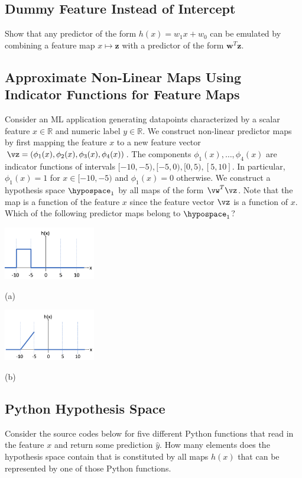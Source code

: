 \documentclass[12pt]{report}
\begin{document}
\subsection{Dummy Feature Instead of Intercept}
\label{sec_dummy_feature}
Show that any predictor of the form $h(x) = w_{1} x +w_{0}$ can be emulated by 
combining a feature map $x \mapsto \mathbf{z}$ with a predictor of the form $\mathbf{w}^{T} \mathbf{z}$. 

\subsection{Approximate Non-Linear Maps Using Indicator Functions for Feature Maps}
\label{ex_2_2}
Consider an ML application generating datapoints characterized by a scalar feature $x \in \mathbb{R}$ 
and numeric label $y \in \mathbb{R}$. We construct non-linear predictor maps by first mapping the 
feature $x$ to a new feature vector $\vz=(\phi_{1}(x),\phi_{2}(x),\phi_{3}(x),\phi_{4}(x))$. 
The components $\phi_{1}(x),\ldots,\phi_{4}(x)$ are indicator functions of intervals 
$[-10,-5), [-5,0),[0,5),[5,10]$. In particular, $\phi_{1}(x) = 1$ for $x \in [-10,-5)$ and $\phi_{1}(x)=0$ otherwise. 
We construct a hypothesis space $\hypospace_{1}$ by all maps of the form $\vw^{T}\vz$. 
Note that the map is a function of the feature $x$ since the feature vector $\vz$ is a function 
of $x$. Which of the following predictor maps belong to $\hypospace_{1}$?

\begin{minipage}{.5\textwidth} %
\includegraphics[width=4cm]{PiecewiseFun1.png}

(a)
\end{minipage} %
\begin{minipage}{.5\textwidth} %
	\includegraphics[width=4cm]{PiecewiseFun2.png}
	
(b)
\end{minipage}
 
 \subsection{Python Hypothesis Space}
 \label{ex_2_3}
 Consider the source codes below for five different Python functions that read 
 in the feature $x$ and return some prediction $\hat{y}$. How many elements 
 does the hypothesis space contain that is constituted by all maps $h(x)$ that 
 can be represented by one of those Python functions. 
 
\end{document}
